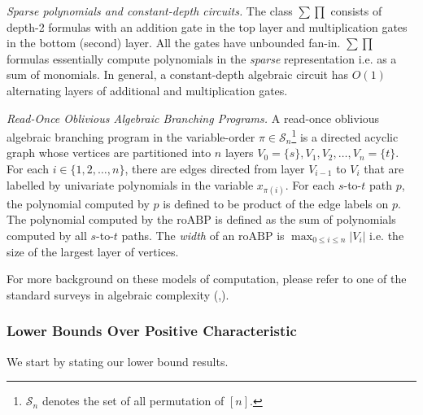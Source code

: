 \documentclass[11pt]{article}
\newtheorem{definition}[theorem]{Definition}
\newcommand{\roABP}{\mathrm{roABP}}
\begin{document}
\textit{Sparse polynomials and constant-depth circuits.} The class $\sum\prod$ consists of depth-2 formulas with an addition gate in the top layer and multiplication gates in the bottom (second) layer. All the gates have unbounded fan-in. $\sum\prod$ formulas essentially compute polynomials in the \emph{sparse} representation i.e. as a sum of monomials. In general, a constant-depth algebraic circuit has $O(1)$ alternating layers of additional and multiplication gates. 




\textit{Read-Once Oblivious Algebraic Branching Programs.}
    A read-once oblivious algebraic branching program in the variable-order $\pi \in \mathcal{S}_n$\footnote{$\mathcal{S}_n$ denotes the set of all permutation of $[n]$.} is a directed acyclic graph whose vertices are partitioned into $n$ layers $V_0 = \{s\}, V_1, V_2, \dots, V_n = \{t\}$. For each $i \in \{1, 2, \dots, n\}$, there are edges directed from layer $V_{i-1}$ to $V_{i}$ that are labelled by univariate polynomials in the variable $x_{\pi(i)}$. For each $s$-to-$t$ path $p$, the polynomial computed by $p$ is defined to be product of the edge labels on $p$. The polynomial computed by the $\roABP$ is defined as the sum of polynomials computed by all $s$-to-$t$ paths. The \emph{width} of an $\roABP$ is $\max_{0\leq i \leq n} |V_i|$ i.e. the size of the largest layer of vertices. 


For more background on these models of computation, please refer to one of the standard surveys in algebraic complexity (\cite{SY10},\cite{saptharishisurvey}).

\subsubsection{Lower Bounds Over Positive Characteristic}
\label{sec:intro-lower}

We start by stating our lower bound results. 
\end{document}

